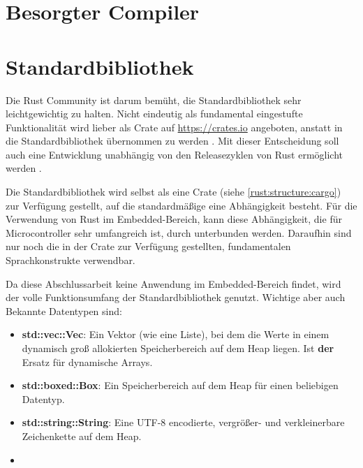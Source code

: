 
\section{Besorgter Compiler}


\section{Standardbibliothek}
\label{rust:stdlib}

Die Rust Community ist darum bemüht, die Standardbibliothek sehr leichtgewichtig zu halten.
Nicht eindeutig als fundamental eingestufte Funktionalität wird lieber als Crate auf \url{https://crates.io} angeboten, anstatt in die Standardbibliothek übernommen zu werden . 
Mit dieser Entscheidung soll auch eine Entwicklung unabhängig von den Releasezyklen von Rust ermöglicht werden .

Die Standardbibliothek wird selbst als eine Crate (siehe \autoref{rust:structure:cargo}) zur Verfügung gestellt, auf die standardmäßige eine Abhängigkeit besteht.
Für die Verwendung von Rust im Embedded-Bereich, kann diese Abhängigkeit, die für Microcontroller sehr umfangreich ist, durch \rustcinline{#![no_std]} unterbunden werden.
Daraufhin sind nur noch die in der  Crate zur Verfügung gestellten, fundamentalen Sprachkonstrukte verwendbar.

Da diese Abschlussarbeit keine Anwendung im Embedded-Bereich findet, wird der volle Funktionsumfang der Standardbibliothek genutzt.
Wichtige aber auch Bekannte Datentypen sind:

\begin{itemize}
	\item \textbf{std::vec::Vec}: Ein Vektor (wie eine Liste), bei dem die Werte in einem dynamisch groß allokierten Speicherbereich auf dem Heap liegen.
	Ist \textbf{der} Ersatz für dynamische Arrays.
	
	\item \textbf{std::boxed::Box}: Ein Speicherbereich auf dem Heap für einen beliebigen Datentyp.
	
	\item \textbf{std::string::String}: Eine UTF-8 encodierte, vergrößer- und verkleinerbare Zeichenkette auf dem Heap.
	
	\item {} 
\end{itemize}


